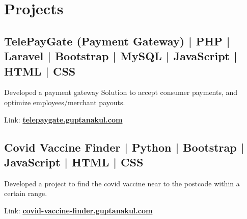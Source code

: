 \documentclass[]{deedy-resume-openfont}
\begin{document}
\begin{minipage}[t]{0.55\textwidth}

\section{Projects}
\subsection{TelePayGate (Payment Gateway) | PHP | Laravel | Bootstrap | MySQL | JavaScript | HTML | CSS}
\sectionsep
\vspace{\topsep}
\begin{tightemize}
\item Developed a payment gateway Solution to accept consumer payments, and optimize employees/merchant payouts.
\item Link: \href{https://telepaygate.guptanakul.com}{\bf telepaygate.guptanakul.com}
\end{tightemize}
\sectionsep
\sectionsep
\subsection{Covid Vaccine Finder | Python | Bootstrap | JavaScript | HTML | CSS}
\sectionsep
\vspace{\topsep}
\begin{tightemize}
\item Developed a project to find the covid vaccine near to the postcode within a certain range.
\item Link: \href{https://covid-vaccine-finder.guptanakul.com}{\bf covid-vaccine-finder.guptanakul.com}
\end{tightemize}
\sectionsep

\end{minipage} 
\sectionsep
\end{document}
